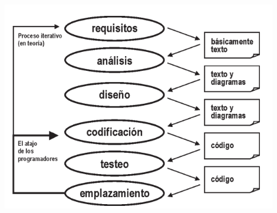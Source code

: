 \begin{flushleft}
\begin{itemize}
\begin{center}
    \includegraphics[width=12cm]{./Imagenes/mdd2}
    \end{center}


\end{itemize}
\end{flushleft}
